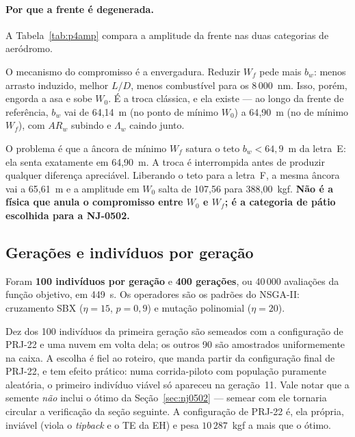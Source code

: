 \paragraph{Por que a frente é degenerada.}
A Tabela~\ref{tab:p4amp} compara a amplitude da frente nas duas
categorias de aeródromo.

\begin{table}[H]
\centering
\caption{Amplitude da frente de Pareto por categoria de aeródromo,
medida entre as âncoras de objetivo único.}
\label{tab:p4amp}
\small

\end{table}

O mecanismo do compromisso é a envergadura. Reduzir $W_f$ pede mais
$b_w$: menos arrasto induzido, melhor $L/D$, menos combustível para os
$8\,000$~nm. Isso, porém, engorda a asa e sobe $W_0$. É a troca clássica,
e ela existe --- ao longo da frente de referência, $b_w$ vai de
64{,}14~m (no ponto de mínimo $W_0$) a 64{,}90~m (no de mínimo
$W_f$), com $AR_w$ subindo e $\Lambda_w$ caindo junto.

O problema é que a âncora de mínimo $W_f$ satura o teto
$b_w < 64{,}9$~m da letra~E: ela senta exatamente em 64{,}90~m.
A troca é interrompida antes de produzir qualquer diferença
apreciável. Liberando o teto para a letra~F, a mesma âncora vai a
65{,}61~m e a amplitude em $W_0$ salta de 107{,}56 para
388{,}00~kgf. \textbf{Não é a física que anula o compromisso entre
$W_0$ e $W_f$; é a categoria de pátio escolhida para a NJ-0502.}

\subsection{Gerações e indivíduos por geração}
\label{sec:p4param}

\begin{table}[H]
\centering
\caption{Configuração do MOGA.}
\label{tab:p4par}
\small

\end{table}

Foram \textbf{100 indivíduos por geração} e \textbf{400
gerações}, ou 40\,000 avaliações da função objetivo, em
449~s. Os operadores são os padrões do NSGA-II: cruzamento SBX
($\eta = 15$, $p = 0{,}9$) e mutação polinomial ($\eta = 20$).

Dez dos 100 indivíduos da primeira geração são semeados com a
configuração de PRJ-22 e uma nuvem em volta dela; os outros 90
são amostrados uniformemente na caixa. A escolha é fiel ao roteiro, que
manda partir da configuração final de PRJ-22, e tem efeito prático: numa
corrida-piloto com população puramente aleatória, o primeiro indivíduo
viável só apareceu na geração~11. Vale notar que a semente \emph{não}
inclui o ótimo da Seção~\ref{sec:nj0502} --- semear com ele tornaria
circular a verificação da seção seguinte. A configuração de PRJ-22 é, ela
própria, inviável (viola o \emph{tipback} e o TE da EH) e pesa $10\,287$~kgf a mais
que o ótimo.

